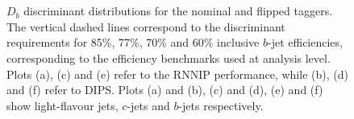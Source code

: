 \begin{figure}[htbp]
    \centering
       \\
     \\
    \caption{$D_b$ discriminant distributions for the nominal and flipped taggers. The vertical dashed lines correspond to the discriminant requirements for 85\%, 77\%, 70\% and 60\% inclusive $b$-jet efficiencies, corresponding to the efficiency benchmarks used at analysis level. Plots (a), (c) and (e) refer to the RNNIP performance, while (b), (d) and (f) refer to DIPS. Plots (a) and (b), (c) and (d), (e) and (f) show light-flavour jets, $c$-jets and $b$-jets respectively.}
    \label{fig:flippedDisc}
\end{figure}





